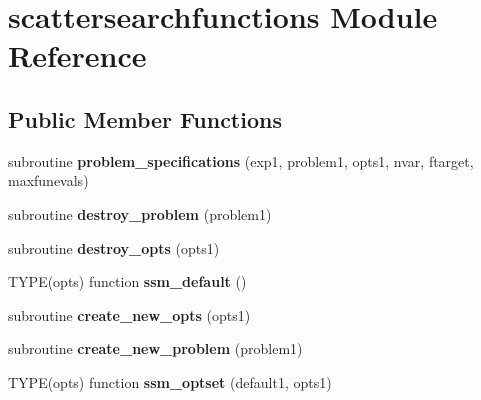 \hypertarget{classscattersearchfunctions}{\section{scattersearchfunctions Module Reference}
\label{classscattersearchfunctions}
}
\subsection*{Public Member Functions}
\begin{DoxyCompactItemize}
\item 
\hypertarget{classscattersearchfunctions_a435159c89689e3dc7792a40c377fb437}{subroutine {\bfseries problem\-\_\-specifications} (exp1, problem1, opts1, nvar, ftarget, maxfunevals)}\label{classscattersearchfunctions_a435159c89689e3dc7792a40c377fb437}

\item 
\hypertarget{classscattersearchfunctions_a077e78542f1721d2303020ab66c5aef8}{subroutine {\bfseries destroy\-\_\-problem} (problem1)}\label{classscattersearchfunctions_a077e78542f1721d2303020ab66c5aef8}

\item 
\hypertarget{classscattersearchfunctions_acb54b750819a4bf535dbfa3613fcd79b}{subroutine {\bfseries destroy\-\_\-opts} (opts1)}\label{classscattersearchfunctions_acb54b750819a4bf535dbfa3613fcd79b}

\item 
\hypertarget{classscattersearchfunctions_aefb857d242fbcaef49e3c3ac317753bd}{T\-Y\-P\-E(opts) function {\bfseries ssm\-\_\-default} ()}\label{classscattersearchfunctions_aefb857d242fbcaef49e3c3ac317753bd}

\item 
\hypertarget{classscattersearchfunctions_ac6ad21bb22e669ef3d116739525d9b28}{subroutine {\bfseries create\-\_\-new\-\_\-opts} (opts1)}\label{classscattersearchfunctions_ac6ad21bb22e669ef3d116739525d9b28}

\item 
\hypertarget{classscattersearchfunctions_a7ade840c63f4a07f6308e4c63ea22efc}{subroutine {\bfseries create\-\_\-new\-\_\-problem} (problem1)}\label{classscattersearchfunctions_a7ade840c63f4a07f6308e4c63ea22efc}

\item 
\hypertarget{classscattersearchfunctions_a7f28c5f60448d43fccd58bde5cbf8277}{T\-Y\-P\-E(opts) function {\bfseries ssm\-\_\-optset} (default1, opts1)}\label{classscattersearchfunctions_a7f28c5f60448d43fccd58bde5cbf8277}


\end{DoxyCompactItemize}

